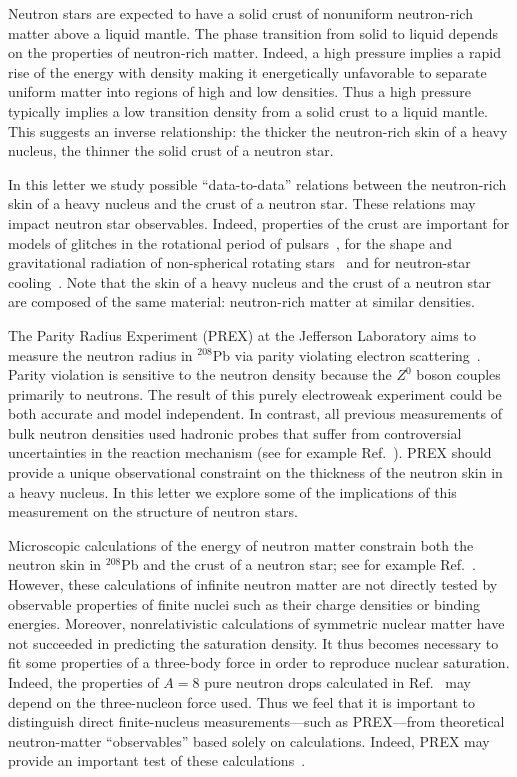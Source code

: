 Neutron stars are expected to have a solid crust of nonuniform
neutron-rich matter above a liquid mantle. The phase transition from
solid to liquid depends on the properties of neutron-rich
matter. Indeed, a high pressure implies a rapid rise of the energy
with density making it energetically unfavorable to separate uniform
matter into regions of high and low densities.  Thus a high pressure
typically implies a low transition density from a solid crust to a
liquid mantle. This suggests an inverse relationship: the thicker the
neutron-rich skin of a heavy nucleus, the thinner the solid crust of 
a neutron star.

In this letter we study possible ``data-to-data'' relations between
the neutron-rich skin of a heavy nucleus and the crust of a neutron
star. These relations may impact neutron star observables. Indeed, 
properties of the crust are important for models of glitches in the 
rotational period of pulsars~\cite{glitch,glitch2}, for the shape 
and gravitational radiation of non-spherical rotating
stars~\cite{grav} and for neutron-star cooling~\cite{brem}. Note 
that the skin of a heavy nucleus and the crust of a neutron star 
are composed of the same material: neutron-rich matter at similar
densities.

The Parity Radius Experiment (PREX) at the Jefferson Laboratory aims
to measure the neutron radius in $^{208}$Pb via parity violating
electron scattering~\cite{prex,bigpaper}.  Parity violation is
sensitive to the neutron density because the $Z^0$ boson couples
primarily to neutrons.  The result of this purely electroweak
experiment could be both accurate and model independent. In contrast,
all previous measurements of bulk neutron densities used hadronic
probes that suffer from controversial uncertainties in the reaction
mechanism (see for example Ref.~\cite{ray}). PREX should provide a
unique observational constraint on the thickness of the neutron skin
in a heavy nucleus. In this letter we explore some of the implications
of this measurement on the structure of neutron stars.

Microscopic calculations of the energy of 
neutron matter constrain both the neutron skin in $^{208}$Pb 
and the crust of a neutron star; see for example Ref.~\cite{vj}.  
However, these calculations of infinite neutron matter are not directly 
tested by observable properties of finite nuclei such as their 
charge densities or binding energies. Moreover, nonrelativistic 
calculations of symmetric nuclear matter have not succeeded in 
predicting the saturation density. It thus becomes necessary 
to fit some properties of a three-body force in order to 
reproduce nuclear saturation. Indeed, the properties of 
$A\!=\!8$ pure neutron drops calculated in Ref.~\cite{drops} 
may depend on the three-nucleon force used. Thus we feel 
that it is important to distinguish direct finite-nucleus 
measurements---such as PREX---from theoretical neutron-matter
``observables'' based solely on calculations.  Indeed, PREX 
may provide an important test of these calculations~\cite{brown}.


